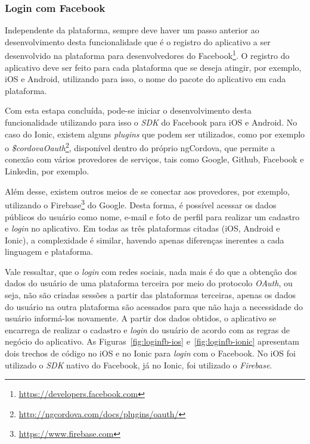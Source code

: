 \subsubsection{Login com Facebook} \label{subsubsec:loginfb}
Independente da plataforma, sempre deve haver um passo anterior ao desenvolvimento desta funcionalidade que é o registro do 
aplicativo a ser desenvolvido na plataforma para desenvolvedores do Facebook\footnote{\url{https://developers.facebook.com}}. O registro do aplicativo deve ser feito
para cada plataforma que se deseja atingir, por exemplo, iOS e Android, utilizando para isso, o nome do pacote do aplicativo em cada plataforma.

Com esta estapa concluída, pode-se iniciar o desenvolvimento desta funcionalidade utilizando para isso o \textit{SDK} do Facebook para iOS e Android.
No caso do Ionic, existem alguns \textit{plugins} que podem ser utilizados, como por exemplo o \textit{\$cordovaOauth}\footnote{\url{http://ngcordova.com/docs/plugins/oauth/}}, disponível dentro do próprio ngCordova, 
que permite a conexão com vários provedores de serviços, tais como Google, Github, Facebook e Linkedin, por exemplo. 

Além desse, existem outros meios de se conectar aos provedores, por exemplo, utilizando o 
Firebase\footnote{\url{https://www.firebase.com}} do Google. Desta forma, é possível acessar os dados públicos do usuário como nome, e-mail e foto de perfil para realizar um cadastro e \textit{login} no aplicativo.
Em todas as três plataformas citadas (iOS, Android e Ionic), a complexidade é similar, havendo apenas diferenças inerentes a cada linguagem e plataforma. 

Vale ressaltar, que o \textit{login} com redes sociais, nada mais é do que a obtenção dos dados do usuário de uma plataforma terceira por meio do protocolo \textit{OAuth}, 
ou seja, não são criadas sessões a partir das plataformas terceiras, apenas os dados do usuário na outra plataforma são acessados para que não haja a necessidade do usuário informá-los novamente. A partir dos dados 
obtidos, o aplicativo se encarrega de realizar o cadastro e \textit{login} do usuário de acordo com as regras de negócio do aplicativo. 
As Figuras~\ref{fig:loginfb-ios} e~\ref{fig:loginfb-ionic} apresentam dois trechos de código no iOS e no Ionic para \textit{login} com o Facebook. No iOS foi utilizado o \textit{SDK} nativo do Facebook, 
já no Ionic, foi utilizado o \textit{Firebase}. 

